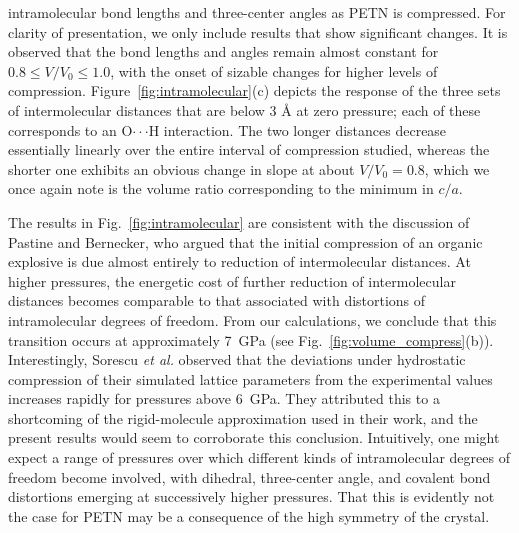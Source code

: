 \documentclass[prb,aps,nobibnotes,twocolumn,doublespace,twocolumngrid,superbib]{revtex4}
\begin{document}
intramolecular bond lengths and three-center angles as PETN is
compressed.  For clarity of presentation, we only include results that
show significant changes.
It is observed that the bond lengths and angles remain almost constant
for $ 0.8 \leq V/V_0 \leq 1.0$, with the onset of sizable changes for
higher levels of compression.  Figure~\ref{fig:intramolecular}(c)
depicts the response of the three sets of intermolecular distances
that are below 3 \AA\/ at zero pressure; each of these corresponds to
an O$\cdot\cdot\cdot$H interaction.  The two longer distances decrease
essentially linearly over the entire interval of compression studied,
whereas the shorter one exhibits an obvious change in slope at about
$V/V_0=0.8$, which we once again note is the volume ratio
corresponding to the minimum in $c/a$.


The results in Fig.~\ref{fig:intramolecular} are consistent with the
discussion of Pastine and Bernecker,\cite{Pastine_1974v45} who argued
that the initial compression of an organic explosive is due almost
entirely to reduction of intermolecular distances.  At higher
pressures, the energetic cost of further reduction of intermolecular
distances becomes comparable to that associated with distortions of
intramolecular degrees of freedom.  From our calculations, we conclude
that this transition occurs at approximately 7~GPa (see
Fig.~\ref{fig:volume_compress}(b)).  Interestingly, Sorescu {\it et
al.}\cite{Sorescu_1999v103} observed that the deviations under
hydrostatic compression of their simulated lattice parameters from the
experimental values increases rapidly for pressures above 6~GPa.  They
attributed this to a shortcoming of the rigid-molecule approximation
used in their work, and the present results would seem to corroborate
this conclusion.  Intuitively, one might expect a range of pressures
over which different kinds of intramolecular degrees of freedom become
involved, with dihedral, three-center angle, and covalent bond
distortions emerging at successively higher pressures.  That this is
evidently not the case for PETN may be a consequence of the high
symmetry of the crystal.
\end{document}
